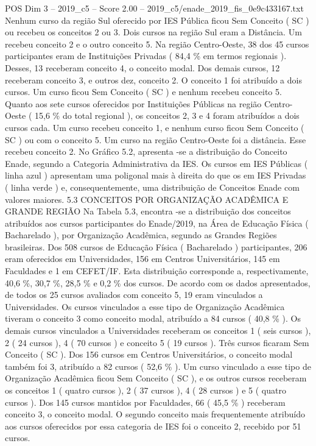 \begin{textsample}{POS Dim 3 – 2019\_c5 – Score 2.00 – 2019\_c5/enade\_2019\_fis\_0e9c433167.txt}
Nenhum curso da região Sul oferecido por IES Pública ficou Sem Conceito ( SC ) ou recebeu os conceitos 2 ou 3.
Dois cursos na região Sul eram a Distância.
Um recebeu conceito 2 e o outro conceito 5.
Na região Centro-Oeste, 38 dos 45 cursos participantes eram de Instituições Privadas ( 84,4 \% em termos regionais ).
Desses, 13 receberam conceito 4, o conceito modal.
Dos demais cursos, 12 receberam conceito 3, e outros dez, conceito 2.
O conceito 1 foi atribuído a dois cursos.
Um curso ficou Sem Conceito ( SC ) e nenhum recebeu conceito 5.
Quanto aos sete cursos oferecidos por Instituições Públicas na região Centro-Oeste ( 15,6 \% do total regional ), os conceitos 2, 3 e 4 foram atribuídos a dois cursos cada.
Um curso recebeu conceito 1, e nenhum curso ficou Sem Conceito ( SC ) ou com o conceito 5.
Um curso na região Centro-Oeste foi a distância.
Esse recebeu conceito 2.
No Gráfico 5.2, apresenta -se a distribuição do Conceito Enade, segundo a Categoria Administrativa da IES.
Os cursos em IES Públicas ( linha azul ) apresentam uma poligonal mais à direita do que os em IES Privadas ( linha verde ) e, consequentemente, uma distribuição de Conceitos Enade com valores maiores. 5.3 CONCEITOS POR ORGANIZAÇÃO ACADÊMICA E GRANDE REGIÃO Na Tabela 5.3, encontra -se a distribuição dos conceitos atribuídos aos cursos participantes do Enade/2019, na Área de Educação Física ( Bacharelado ), por Organização Acadêmica, segundo as Grandes Regiões brasileiras.
Dos 508 cursos de Educação Física ( Bacharelado ) participantes, 206 eram oferecidos em Universidades, 156 em Centros Universitários, 145 em Faculdades e 1 em CEFET/IF.
Esta distribuição corresponde a, respectivamente, 40,6 \%, 30,7 \%, 28,5 \% e 0,2 \% dos cursos.
De acordo com os dados apresentados, de todos os 25 cursos avaliados com conceito 5, 19 eram vinculados a Universidades.
Os cursos vinculados a esse tipo de Organização Acadêmica tiveram o conceito 3 como conceito modal, atribuído a 84 cursos ( 40,8 \% ).
Os demais cursos vinculados a Universidades receberam os conceitos 1 ( seis cursos ), 2 ( 24 cursos ), 4 ( 70 cursos ) e conceito 5 ( 19 cursos ).
Três cursos ficaram Sem Conceito ( SC ).
Dos 156 cursos em Centros Universitários, o conceito modal também foi 3, atribuído a 82 cursos ( 52,6 \% ).
Um curso vinculado a esse tipo de Organização Acadêmica ficou Sem Conceito ( SC ), e os outros cursos receberam os conceitos 1 ( quatro cursos ), 2 ( 37 cursos ), 4 ( 28 cursos ) e 5 ( quatro cursos ).
Dos 145 cursos mantidos por Faculdades, 66 ( 45,5 \% ) receberam conceito 3, o conceito modal.
O segundo conceito mais frequentemente atribuído aos cursos oferecidos por essa categoria de IES foi o conceito 2, recebido por 51 cursos.

\end{textsample}
